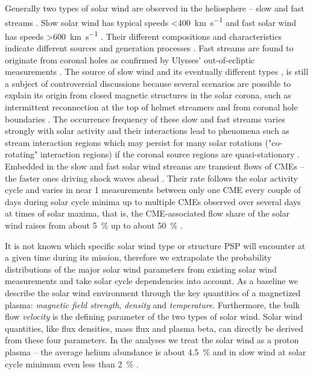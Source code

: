 \documentclass[]{aa}
\begin{document}
	Generally two types of solar wind are observed in the heliosphere -- slow and fast streams \citep{Neugebauer1966,Schwenn1983}. Slow solar wind has typical speeds \SI{<400}{\km\per\s} and fast solar wind has speeds \SI{>600}{\km\per\s} \citep[p.~144]{Schwenn1990}. Their different compositions and characteristics indicate different sources and generation processes \citep{McGregor2011a}. Fast streams are found to originate from coronal holes as confirmed by Ulysses' out-of-ecliptic measurements \citep{McComas1998}. The source of slow wind and its eventually different types \citep{Schwenn1983}, is still a subject of controversial discussions because several scenarios are possible to explain its origin from closed magnetic structures in the solar corona, such as intermittent reconnection at the top of helmet streamers and from coronal hole boundaries \citep{Kilpua2016}. The occurrence frequency of these slow and fast streams varies strongly with solar activity and their interactions lead to phenomena such as stream interaction regions which may persist for many solar rotations ("co-rotating" interaction regions) if the coronal source regions are quasi-stationary \citep{Balogh1999}.
	Embedded in the slow and fast solar wind streams are transient flows of CMEs -- the faster ones driving shock waves ahead \citep{Gosling1974}. Their rate follows the solar activity cycle and varies in near \SI{1}{\au} measurements between only one CME every couple of days during solar cycle minima up to multiple CMEs observed over several days at times of solar maxima, that is, the CME-associated flow share of the solar wind raises from about \SI{5}{\percent} up to about \SI{50}{\percent} \citep{Richardson2012}.

	It is not known which specific solar wind type or structure PSP will encounter at a given time during its mission, therefore we extrapolate the probability distributions of the major solar wind parameters from existing solar wind measurements and take solar cycle dependencies into account.
	As a baseline we describe the solar wind environment through the key quantities of a magnetized plasma: \emph{magnetic field strength}, \emph{density} and \emph{temperature}. Furthermore, the bulk flow \emph{velocity} is the defining parameter of the two types of solar wind. Solar wind quantities, like flux densities, mass flux and plasma beta, can directly be derived from these four parameters. In the analyses we treat the solar wind as a proton plasma -- the average helium abundance is about \SI{4.5}{\percent} and in slow wind at solar cycle minimum even less than \SI{2}{\percent} \citep{Feldman1978,Schwenn1983,Kasper2012}.
\end{document}
